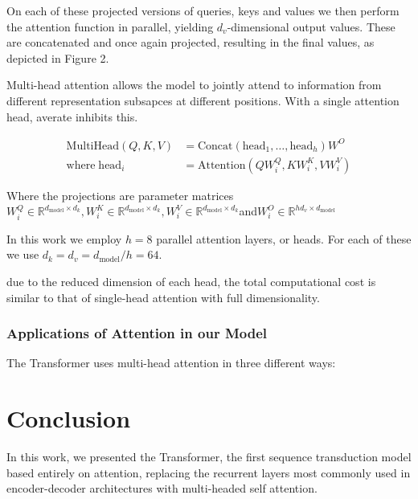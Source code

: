 \documentclass{article}
\begin{document}
On each of these projected versions of queries, keys and values we then perform the attention function in parallel, yielding $d_v$-dimensional output values. These are concatenated and once again projected, resulting in the final values, as depicted in Figure 2.

Multi-head attention allows the model to jointly attend to information from different representation subsapces at different positions. With a single attention head, averate inhibits this.

\begin{eqnarray}
\mathrm{MultiHead}\left(Q,K,V\right)&=\mathrm{Concat}\left(\mathrm{head}_1,\dots,\mathrm{head}_h\right)W^O
\\
\mathrm{where}\;\mathrm{head}_i&=\mathrm{Attention}\left(QW^Q_i,KW^K_i,VW^V_i\right)
\end{eqnarray}

Where the projections are parameter matrices $W^Q_i\in\mathbb{R}^{d_\mathrm{model}\times d_k},W^K_i\in\mathbb{R}^{d_\mathrm{model}\times d_k}, W^V_i\in\mathbb{R}^{d_\mathrm{model}\times d_k}$and$W^O_i\in\mathbb{R}^{hd_v\times d_\mathrm{model}}$

In this work we employ $h=8$ parallel attention layers, or heads. For each of these we use $d_k=d_v=d_\mathrm{model}/h=64$.

due to the reduced dimension of each head, the total computational cost is similar to that of single-head attention with full dimensionality.

\subsubsection{Applications of Attention in our Model}

The Transformer uses multi-head attention in three different ways:



\section{Conclusion}

In this work, we presented the Transformer, the first sequence transduction model based entirely on attention, replacing the recurrent layers most commonly used in encoder-decoder architectures with multi-headed self attention.
\end{document}

